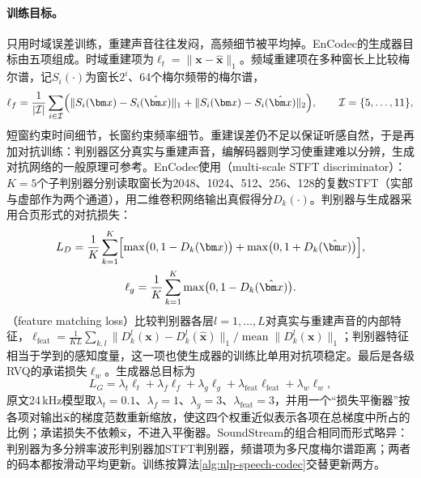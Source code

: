 \paragraph{训练目标。}只用时域误差训练，重建声音往往发闷，高频细节被平均掉。EnCodec的生成器目标由五项组成。时域重建项为$\ell_t=\lVert\bm x-\hat{\bm x}\rVert_1$。频域重建项在多种窗长上比较梅尔谱，记$S_i(\cdot)$为窗长$2^i$、64个梅尔频带的梅尔谱，
\[
 \ell_f=\frac{1}{|\mathcal I|}\sum_{i\in\mathcal I}\Bigl(\lVert S_i(\bm x)-S_i(\hat{\bm x})\rVert_1+\lVert S_i(\bm x)-S_i(\hat{\bm x})\rVert_2\Bigr),
 \qquad \mathcal I=\{5,\ldots,11\},
\]
短窗约束时间细节，长窗约束频率细节。重建误差仍不足以保证听感自然，于是再加对抗训练：判别器区分真实与重建声音，编解码器则学习使重建难以分辨，生成对抗网络的一般原理可参考。EnCodec使用（multi-scale STFT discriminator）：$K=5$个子判别器分别读取窗长为2048、1024、512、256、128的复数STFT（实部与虚部作为两个通道），用二维卷积网络输出真假得分$D_k(\cdot)$。判别器与生成器采用合页形式的对抗损失：
\[
 \begin{gathered}
 L_D=\frac1K\sum_{k=1}^{K}\Bigl[\max\bigl(0,1-D_k(\bm x)\bigr)+\max\bigl(0,1+D_k(\hat{\bm x})\bigr)\Bigr],\\
 \ell_g=\frac1K\sum_{k=1}^{K}\max\bigl(0,1-D_k(\hat{\bm x})\bigr).
 \end{gathered}
\]
（feature matching loss）比较判别器各层$l=1,\ldots,L$对真实与重建声音的内部特征，$\ell_{\mathrm{feat}}=\frac{1}{KL}\sum_{k,l}\lVert D_k^l(\bm x)-D_k^l(\hat{\bm x})\rVert_1/\operatorname{mean}\lVert D_k^l(\bm x)\rVert_1$；判别器特征相当于学到的感知度量，这一项也使生成器的训练比单用对抗项稳定。最后是各级RVQ的承诺损失$\ell_w$。生成器总目标为
\begin{equation}
 L_G=\lambda_t\ell_t+\lambda_f\ell_f+\lambda_g\ell_g+\lambda_{\mathrm{feat}}\ell_{\mathrm{feat}}+\lambda_w\ell_w,
 \label{eq:nlp-speech-encodec}
\end{equation}
原文24\,kHz模型取$\lambda_t=0.1$、$\lambda_f=1$、$\lambda_g=3$、$\lambda_{\mathrm{feat}}=3$，并用一个“损失平衡器”按各项对输出$\hat{\bm x}$的梯度范数重新缩放，使这四个权重近似表示各项在总梯度中所占的比例；承诺损失不依赖$\hat{\bm x}$，不进入平衡器。SoundStream的组合相同而形式略异：判别器为多分辨率波形判别器加STFT判别器，频谱项为多尺度梅尔谱距离；两者的码本都按滑动平均更新。训练按算法\ref{alg:nlp-speech-codec}交替更新两方。

